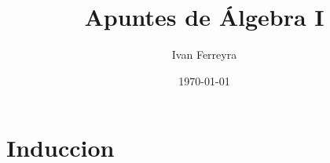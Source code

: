 \documentclass[11pt]{article}
\title{\textbf{Apuntes de Álgebra I}}
\author{Ivan Ferreyra}
\date{\today}
\begin{document}
\section{Induccion}
\end{document}
